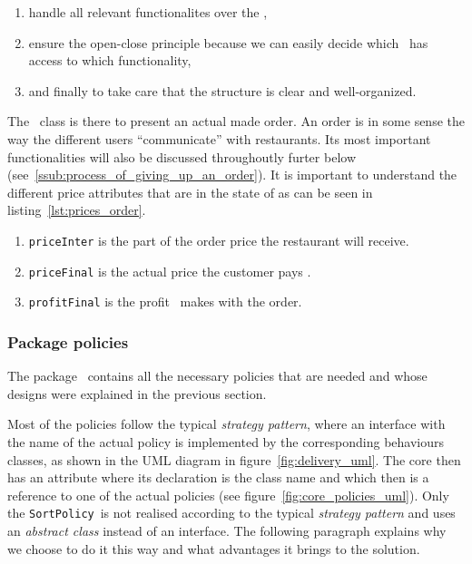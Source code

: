 \begin{enumerate}
	\item handle all relevant functionalites over the \Core,
	\item ensure the open-close principle because we can easily decide
  which \User~has access to which functionality,
	\item and finally to take care that the structure is clear and well-organized.
\end{enumerate}

The \Order~class is there to present an actual made order.
An order is in some sense the way the different users ``communicate'' with restaurants.
Its most important functionalities will also be discussed throughoutly 
furter below (see~\ref{ssub:process_of_giving_up_an_order}).
It is important to understand the different price attributes that are in 
the state of \Order as can be seen in listing~\ref{lst:prices_order}.

\begin{enumerate}
	\item \lstinline|priceInter| is the part of the order price the restaurant will receive.
	\item \lstinline|priceFinal| is the actual price the customer pays \MyFoodora.
	\item \lstinline|profitFinal| is the profit \MyFoodora~makes with the order. 
\end{enumerate}


\subsubsection{Package policies} %
\label{ssub:policies}

The package \policies~contains all the necessary policies that are needed
and whose designs were explained in the previous section.

Most of the policies follow the typical \emph{strategy pattern},
where an interface with the name of the actual policy is implemented by the corresponding
behaviours classes, as shown in the UML diagram in figure~\ref{fig:delivery_uml}.
The core then has an attribute where its declaration is the class name
and which then is a reference to one of the actual policies (see 
figure~\ref{fig:core_policies_uml}). 
Only the \lstinline|SortPolicy|~is not realised according to
the typical \emph{strategy pattern}
and uses an \emph{abstract class} instead of an interface.
The following paragraph explains why we choose to do it this way
and what advantages it brings to the solution.

